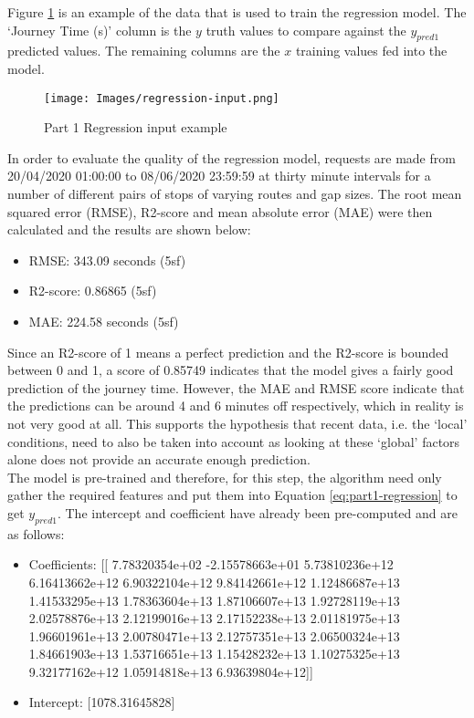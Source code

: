 Figure \ref{fig:part1-regression-input} is an example of the data that is used to train the regression model. The `Journey Time (s)' column is the $y$ truth values to compare against the $y_{pred1}$ predicted values. The remaining columns are the $x$ training values fed into the model.

\begin{figure}[H]
\begin{center}
    \texttt{[image: Images/regression-input.png]}
    \caption{Part 1 Regression input example}
    \label{fig:part1-regression-input}
\end{center}
\end{figure}

In order to evaluate the quality of the regression model, requests are made from 20/04/2020 01:00:00 to 08/06/2020 23:59:59 at thirty minute intervals for a number of different pairs of stops of varying routes and gap sizes. The root mean squared error (RMSE), R2-score and mean absolute error (MAE) were then calculated and the results are shown below:  

\begin{itemize}
    \item RMSE: 343.09 seconds (5sf)
    \item R2-score: 0.86865 (5sf)
    \item MAE: 224.58 seconds (5sf)
\end{itemize}

Since an R2-score of 1 means a perfect prediction and the R2-score is bounded between 0 and 1, a score of 0.85749 indicates that the model gives a fairly good prediction of the journey time. However, the MAE and RMSE score indicate that the predictions can be around 4 and 6 minutes off respectively, which in reality is not very good at all. This supports the hypothesis that recent data, i.e. the `local' conditions, need to also be taken into account as looking at these `global' factors alone does not provide an accurate enough prediction. \\

The model is pre-trained and therefore, for this step, the algorithm need only gather the required features and put them into Equation \ref{eq:part1-regression} to get $y_{pred1}$. The intercept and coefficient have already been pre-computed and are as follows:

\begin{itemize}
    \item Coefficients: [[ 7.78320354e+02 -2.15578663e+01  5.73810236e+12  6.16413662e+12
   6.90322104e+12  9.84142661e+12  1.12486687e+13  1.41533295e+13
   1.78363604e+13  1.87106607e+13  1.92728119e+13  2.02578876e+13
   2.12199016e+13  2.17152238e+13  2.01181975e+13  1.96601961e+13
   2.00780471e+13  2.12757351e+13  2.06500324e+13  1.84661903e+13
   1.53716651e+13  1.15428232e+13  1.10275325e+13  9.32177162e+12
   1.05914818e+13  6.93639804e+12]]
   \item Intercept: [1078.31645828]
\end{itemize}

